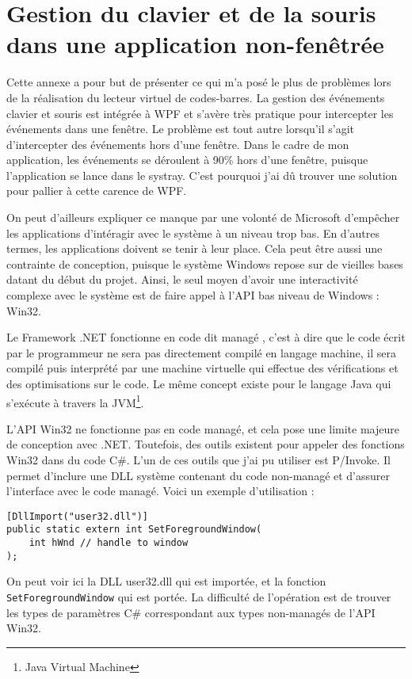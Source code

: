 \chapter{Gestion du clavier et de la souris dans une application non-fenêtrée}
\label{hook}

Cette annexe a pour but de présenter ce qui m'a posé le plus de problèmes lors de la réalisation du lecteur virtuel de codes-barres. La gestion des événements clavier et souris est intégrée à WPF et s'avère très pratique pour intercepter les événements dans une fenêtre. Le problème est tout autre lorsqu'il s'agit d'intercepter des événements hors d'une fenêtre. Dans le cadre de mon application, les événements se déroulent à 90\% hors d'une fenêtre, puisque l'application se lance dans le systray. C'est pourquoi j'ai dû trouver une solution pour pallier à cette carence de WPF.

On peut d'ailleurs expliquer ce manque par une volonté de Microsoft d'empêcher les applications d'intéragir avec le système à un niveau trop bas. En d'autres termes, les applications doivent se tenir à leur place. Cela peut être aussi une contrainte de conception, puisque le système Windows repose sur de vieilles bases datant du début du projet. Ainsi, le seul moyen d'avoir une interactivité complexe avec le système est de faire appel à l'API bas niveau de Windows : Win32.

Le Framework .NET fonctionne en code dit \og managé \fg{}, c'est à dire que le code écrit par le programmeur ne sera pas directement compilé en langage machine, il sera compilé puis interprété par une machine virtuelle qui effectue des vérifications et des optimisations sur le code. Le même concept existe pour le langage Java qui s'exécute à travers la JVM\footnote{Java Virtual Machine}.

L'API Win32 ne fonctionne pas en code managé, et cela pose une limite majeure de conception avec .NET. Toutefois, des outils existent pour appeler des fonctions Win32 dans du code C\#. L'un de ces outils que j'ai pu utiliser est P/Invoke. Il permet d'inclure une DLL système contenant du code non-managé et d'assurer l'interface avec le code managé. Voici un exemple d'utilisation :

\pagebreak
\begin{lstlisting}
[DllImport("user32.dll")]
public static extern int SetForegroundWindow(
	int hWnd // handle to window
);
\end{lstlisting}

On peut voir ici la DLL \og user32.dll \fg{} qui est importée, et la fonction \verb|SetForegroundWindow| qui est portée. La difficulté de l'opération est de trouver les types de paramètres C\# correspondant aux types non-managés de l'API Win32.

